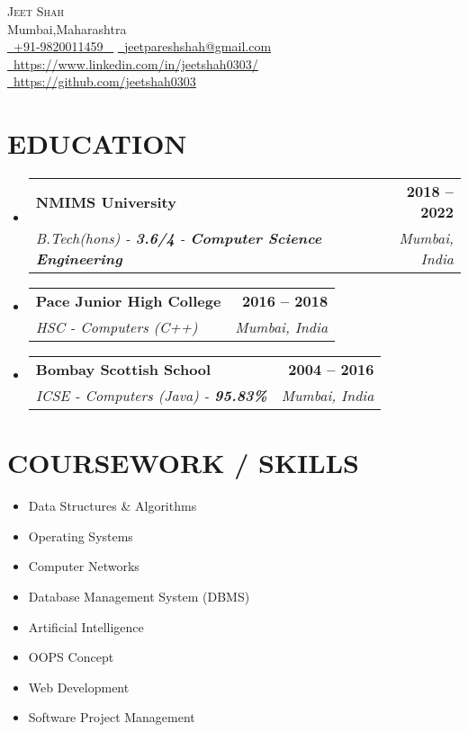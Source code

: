 \documentclass[letterpaper,11pt]{article}
\makeatletter
\newcommand{\resumeSubheading}[4]{
  \vspace{-2pt}\item
    \begin{tabular*}{1.0\textwidth}[t]{l@{\extracolsep{\fill}}r}
      \textbf{\large#1} & \textbf{\small #2} \\
      \textit{\large#3} & \textit{\small #4} \\
      
    \end{tabular*}\vspace{-7pt}
}
\newcommand{\resumeSubHeadingListStart}{\begin{itemize}[leftmargin=0.0in, label={}]}
\newcommand{\resumeSubHeadingListEnd}{\end{itemize}}
\makeatother
\begin{document}


\begin{center}
    {\Huge \scshape Jeet Shah} \\ \vspace{1pt}
    Mumbai,Maharashtra \\ \vspace{1pt}
    \small \href{tel:+919820011459}{ \raisebox{-0.1\height}\faPhone\ \underline{+91-9820011459} ~} \href{mailto:jeetpareshshah@gmail.com}{\raisebox{-0.2\height}\faEnvelope\  \underline{jeetpareshshah@gmail.com}} ~ 
    \href{https://www.linkedin.com/in/jeetshah0303/}{\raisebox{-0.2\height}\faLinkedinSquare\ \underline{https://www.linkedin.com/in/jeetshah0303/}}  ~
    \href{https://github.com/jeetshah0303}{\raisebox{-0.2\height}\faGithub\ \underline{https://github.com/jeetshah0303}} ~
    \vspace{-8pt}
\end{center}


\section{EDUCATION}
  \resumeSubHeadingListStart
    \resumeSubheading
      {NMIMS University}{2018 -- 2022}
      {B.Tech(hons) - \textbf{3.6/4} - \textbf{Computer Science Engineering}}{Mumbai, India}
  \resumeSubHeadingListEnd
  
  \resumeSubHeadingListStart
    \resumeSubheading
      {Pace Junior High College}{2016 -- 2018}
      {HSC - Computers (C++)\textbf{}}{Mumbai, India}
  \resumeSubHeadingListEnd

  \resumeSubHeadingListStart
    \resumeSubheading
      {Bombay Scottish School}{2004 -- 2016}
      {ICSE - Computers (Java) - \textbf{95.83\%}}{Mumbai, India}
  \resumeSubHeadingListEnd
\section{COURSEWORK / SKILLS}
        \begin{multicols}{4}
            \begin{itemize}[itemsep=-2pt, parsep=5pt]
                \item Data Structures \& Algorithms
                \item Operating Systems
                \item Computer Networks
                \item Database Management System (DBMS)
                \item Artificial Intelligence
                \item OOPS Concept
                \item Web Development
                \item Software Project Management
            \end{itemize}
        \end{multicols}
        \vspace*{2.0\multicolsep}
\end{document}
